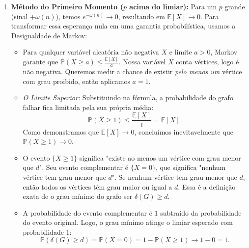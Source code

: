 \documentclass[11pt, a4paper]{article}
\begin{document}
\begin{enumerate}
    \item \textbf{Método do Primeiro Momento ($p$ acima do limiar):} 
     Para um $p$ grande (sinal $+\omega(n)$), temos $e^{-\omega(n)} \to 0$, resultando em $\mathbb{E}[X] \to 0$. Para transformar essa esperança nula em uma garantia probabilística, usamos a Desigualdade de Markov:
    \begin{itemize}
        \item Para qualquer variável aleatória não negativa $X$ e limite $a > 0$, Markov garante que $\mathbb{P}(X \ge a) \le \frac{\mathbb{E}[X]}{a}$. Nossa variável $X$ conta vértices, logo é não negativa. Queremos medir a chance de existir \textit{pelo menos um} vértice com grau proibido, então aplicamos $a = 1$.
        \item \textit{O Limite Superior:} Substituindo na fórmula, a probabilidade do grafo falhar fica limitada pela sua própria média:
        \[ \mathbb{P}(X \ge 1) \le \frac{\mathbb{E}[X]}{1} = \mathbb{E}[X]. \]
        Como demonstramos que $\mathbb{E}[X] \to 0$, concluímos inevitavelmente que $\mathbb{P}(X \ge 1) \to 0$.
        \item  O evento $\{X \ge 1\}$ significa "existe ao menos um vértice com grau menor que $d$". Seu evento complementar é $\{X = 0\}$, que significa "nenhum vértice tem grau menor que $d$". Se nenhum vértice tem grau menor que $d$, então todos os vértices têm grau maior ou igual a $d$. Essa é a definição exata de o grau mínimo do grafo ser $\delta(G) \ge d$.
        \item A probabilidade do evento complementar é $1$ subtraído da probabilidade do evento original. Logo, o grau mínimo atinge o limiar esperado com probabilidade $1$:
        \[ \mathbb{P}(\delta(G) \ge d) = \mathbb{P}(X = 0) = 1 - \mathbb{P}(X \ge 1) \to 1 - 0 = 1. \]
    \end{itemize}


\end{enumerate}
\end{document}
